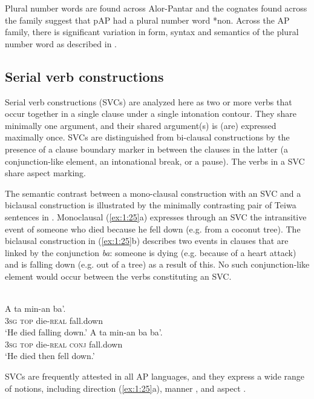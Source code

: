 Plural number words are found across Alor-Pantar and the cognates found across the family suggest that pAP had a plural number word *non. Across the AP family, there is significant variation in form, syntax and semantics of the plural number word as described in \citet{KlamerEtAlTVplural}. 

\subsection{Serial verb constructions}\label{sec:1:5.5}
Serial verb constructions (SVCs) are analyzed here as two or more verbs that occur together in a single clause under a single intonation contour. They share minimally one argument, and their shared argument(s) is (are) expressed maximally once. SVCs are distinguished from bi-clausal constructions by the presence of a clause boundary marker in between the clauses in the latter (a conjunction-like element, an intonational break, or a pause). The verbs in a SVC share aspect marking. 

The semantic contrast between a mono-clausal construction with an SVC and a biclausal construction is illustrated by the minimally contrasting pair of Teiwa sentences in . Monoclausal (\ref{ex:1:25}a) expresses through an SVC the intransitive event of someone who died because he fell down (e.g. from a coconut tree). The biclausal construction in (\ref{ex:1:25}b) describes two events in clauses that are linked by the conjunction \textit{ba}: someone is dying (e.g. because of a heart attack) and is falling down (e.g. out of a tree) as a result of this. No such conjunction-like element would occur between the verbs constituting an SVC.



\ea%
\label{ex:1:25}
 \\
\ea
\gll A  ta  min-an  ba'. \\
 3\textsc{sg}  \textsc{top}  die-\textsc{real}  fall.down    \\
\glt `He died falling down.' 
\ex
\gll A  ta  min-an  ba  ba'.  \\
 3\textsc{sg}  \textsc{top}  die-\textsc{real}  \textsc{conj} fall.down    \\
\glt `He died then fell down.' 
\z 
\z 
 


SVCs are frequently attested in all AP languages, and they express a wide range of notions, including direction (\ref{ex:1:25}a), manner , and aspect . 



